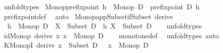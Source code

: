 \begin{isabellebody}
\ unfold{\isacharunderscore}{\kern0pt}types%
\endisatagproof
{\isafoldproof}%
%
\isadelimproof
\isanewline
%
\endisadelimproof
\isanewline
{}\isamarkupfalse%
\ Monop{\isacharunderscore}{\kern0pt}prefixpoint{\isacharcolon}{\kern0pt}\ {\isachardoublequoteopen}h\ {\isacharcolon}{\kern0pt}\ Monop\ D\ {\isasymLongrightarrow}\ prefixpoint\ D\ h{\isachardoublequoteclose}\isanewline
%
\isadelimproof
\ \ %
\endisadelimproof
%
\isatagproof
{}\isamarkupfalse%
\ prefixpoint{\isacharunderscore}{\kern0pt}def\ \isamarkupfalse%
\ auto%
\endisatagproof
{\isafoldproof}%
%
\isadelimproof
\isanewline
%
\endisadelimproof
\isanewline
{}\isamarkupfalse%
\ Monop{\isacharunderscore}{\kern0pt}app{\isacharunderscore}{\kern0pt}Subset{\isacharunderscore}{\kern0pt}if{\isacharunderscore}{\kern0pt}Subset\ {\isacharbrackleft}{\kern0pt}derive{\isacharbrackright}{\kern0pt}{\isacharcolon}{\kern0pt}\isanewline
\ \ {\isachardoublequoteopen}h\ {\isacharcolon}{\kern0pt}\ Monop\ D\ {\isasymLongrightarrow}\ X\ {\isacharcolon}{\kern0pt}\ Subset\ D\ {\isasymLongrightarrow}\ h\ X\ {\isacharcolon}{\kern0pt}\ Subset\ D{\isachardoublequoteclose}\isanewline
%
\isadelimproof
\ \ %
\endisadelimproof
%
\isatagproof
{}\isamarkupfalse%
\ unfold{\isacharunderscore}{\kern0pt}types%
\endisatagproof
{\isafoldproof}%
%
\isadelimproof
%
\endisadelimproof
%
\isadelimdocument
%
\endisadelimdocument
%
\isatagdocument
%
\isamarkuptrue%
%
\endisatagdocument
{\isafolddocument}%
%
\isadelimdocument
%
\endisadelimdocument
{}\isamarkupfalse%
\ id{\isacharunderscore}{\kern0pt}Monop\ {\isacharbrackleft}{\kern0pt}derive{\isacharbrackright}{\kern0pt}{\isacharcolon}{\kern0pt}\ {\isachardoublequoteopen}{\isacharparenleft}{\kern0pt}{\isasymlambda}x{\isachardot}{\kern0pt}\ x{\isacharparenright}{\kern0pt}\ {\isacharcolon}{\kern0pt}\ Monop\ D{\isachardoublequoteclose}\isanewline
%
\isadelimproof
\ \ %
\endisadelimproof
%
\isatagproof
{}\isamarkupfalse%
\ monotone{\isacharunderscore}{\kern0pt}def\ \isamarkupfalse%
\ unfold{\isacharunderscore}{\kern0pt}types\ auto%
\endisatagproof
{\isafoldproof}%
%
\isadelimproof
\isanewline
%
\endisadelimproof
\isanewline
{}\isamarkupfalse%
\ K{\isacharunderscore}{\kern0pt}MonopI\ {\isacharbrackleft}{\kern0pt}derive{\isacharbrackright}{\kern0pt}{\isacharcolon}{\kern0pt}\ {\isachardoublequoteopen}x\ {\isacharcolon}{\kern0pt}\ Subset\ D\ {\isasymLongrightarrow}\ {\isacharparenleft}{\kern0pt}{\isasymlambda}{\isacharunderscore}{\kern0pt}{\isachardot}{\kern0pt}\ x{\isacharparenright}{\kern0pt}\ {\isacharcolon}{\kern0pt}\ Monop\ D{\isachardoublequoteclose}\isanewline

\end{isabellebody}
